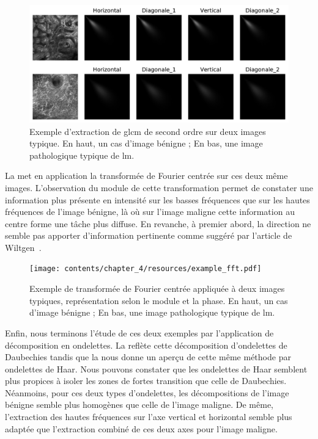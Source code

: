 \begin{figure}[H]
    \centering
    \includegraphics[width=\linewidth]{contents/chapter_4/resources/example_glcm.pdf}
    \caption{Exemple d'extraction de \gls{glcm} de second ordre sur deux images typique. En haut, un cas d'image bénigne ; En bas, une image pathologique typique de \gls{lm}.}
    \label{fig:example_glcm}
\end{figure}\par

La  met en application la transformée de Fourier centrée sur ces deux même images. L'observation du module de cette transformation permet de constater une information plus présente en intensité sur les basses fréquences que sur les hautes fréquences de l'image bénigne, là où sur l'image maligne cette information au centre forme une tâche plus diffuse. En revanche, à premier abord, la direction ne semble pas apporter d'information pertinente comme suggéré par l'article de Wiltgen~\cite{Wiltgen2008}.\par

\begin{figure}[H]
    \centering
    \texttt{[image: contents/chapter\_4/resources/example\_fft.pdf]}
    \caption{Exemple de transformée de Fourier centrée appliquée à deux images typiques, représentation selon le module et la phase. En haut, un cas d'image bénigne ; En bas, une image pathologique typique de \gls{lm}.}
    \label{fig:example_fft}
\end{figure}\par

Enfin, nous terminons l'étude de ces deux exemples par l'application de décomposition en ondelettes. La  reflète cette décomposition d'ondelettes de Daubechies tandis que la  nous donne un aperçu de cette même méthode par ondelettes de Haar. Nous pouvons constater que les ondelettes de Haar semblent plus propices à isoler les zones de fortes transition que celle de Daubechies. Néanmoins, pour ces deux types d'ondelettes, les décompositions de l'image bénigne semble plus homogènes que celle de l'image maligne. De même, l'extraction des hautes fréquences sur l'axe vertical et horizontal semble plus adaptée que l'extraction combiné de ces deux axes pour l'image maligne.\par

